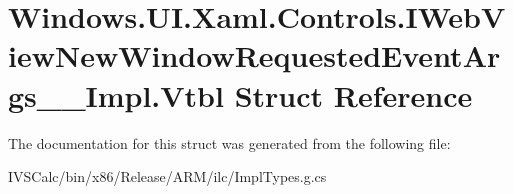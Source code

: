 \hypertarget{struct_windows_1_1_u_i_1_1_xaml_1_1_controls_1_1_i_web_view_new_window_requested_event_args_____impl_1_1_vtbl}{}\section{Windows.\+U\+I.\+Xaml.\+Controls.\+I\+Web\+View\+New\+Window\+Requested\+Event\+Args\+\_\+\+\_\+\+Impl.\+Vtbl Struct Reference}
\label{struct_windows_1_1_u_i_1_1_xaml_1_1_controls_1_1_i_web_view_new_window_requested_event_args_____impl_1_1_vtbl}


The documentation for this struct was generated from the following file\+:\begin{DoxyCompactItemize}
\item 
I\+V\+S\+Calc/bin/x86/\+Release/\+A\+R\+M/ilc/Impl\+Types.\+g.\+cs\end{DoxyCompactItemize}
